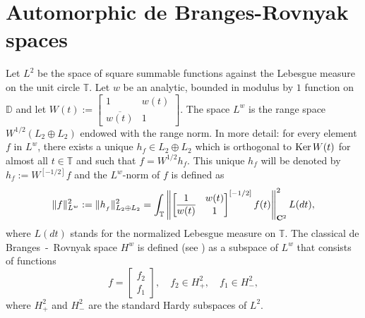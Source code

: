 \documentclass[reqno,11pt,centertags]{article}
\newcommand{\bbD}{{\mathbb{D}}}
\newcommand{\bbT}{{\mathbb{T}}}
\theoremstyle{definition}
\def\C{{\bf C}}
\begin{document}
\section{Automorphic de Branges-Rovnyak spaces}


Let $L^2$ be the space of square summable functions against the Lebesgue measure
 on the unit circle $\bbT$.
Let $w$ be an analytic, bounded in modulus by $1$ function on $\bbD$ and let
$W(t):=
\begin{bmatrix}
1& w(t) \\
\overline{w(t)} & 1 
\end{bmatrix}
$. 
The space $L^w$ is the range
space $W^{1/2}(L_2\oplus L_2)$ endowed with the range norm. In more
detail: for every element $f$ in $L^w$, there exists a unique $h_f\in
L_2\oplus L_2$ which is orthogonal to ${\rm Ker}\, W(t)$ for almost all
$t\in\mathbb T$ and such that $f=W^{1/2}h_f$. This unique $h_f$ will be denoted
by $h_f:=W^{[-1/2]}f$ and the $L^w$-norm of $f$ is defined as
$$
\|f\|_{L^w}^2:=\|h_{_f}\|_{L_2\oplus L_2}^2=
\int_{\mathbb T}\left\|
\begin{bmatrix}
1& w(t) \\
\overline{w(t)} & 1
\end{bmatrix}
^{[-1/2]}f(t)\right\|^2_{\C^2}L(dt),
$$
where $L(dt)$ stands for the normalized Lebesgue
measure on $\mathbb T$. The classical de Branges~-~Rovnyak space $H^w$
is defined (see \cite{BR}) as a subspace of $L^w$ that consists of functions
$$
f=\begin{bmatrix} f_2 \\ f_1\end{bmatrix},\quad f_2\in H^2_+,\quad f_1\in H^2_-,
$$
where $H^2_+$ and $H^2_-$ are the standard Hardy subspaces of $L^2$.
\end{document}
